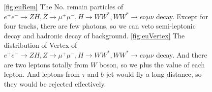 \documentclass[11pt,a4paper]{cepcnote}
\begin{document}
\begin{figure}[H]
\centering
\caption[]{\ref{fig:euRem} The No. remain particles of $e^+e^-\rightarrow ZH, Z\rightarrow\mu^+\mu^-, H\rightarrow WW^*,  
	WW^*\rightarrow e\nu\mu\nu$ decay. Except for four tracks, there are few photons, so we can veto semi-leptonic decay
	and hadronic decay of background.
	\ref{fig:euVertex} The distribution of Vertex of $e^+e^-\rightarrow ZH, Z\rightarrow\mu^+\mu^-, H\rightarrow WW^*, 
	WW^*\rightarrow e\nu\mu\nu$ decay. And there are two leptons totally from $W$ boson, so we plus the value of each lepton.
	And leptons from $\tau$ and $b$-jet would fly a long distance, so they would be rejected effectively.}
\label{fig:euRemandVertex}
\end{figure}
\end{document}
